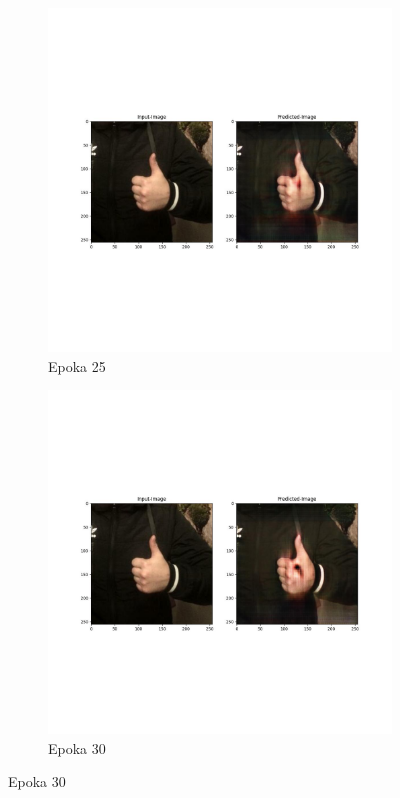 \documentclass[12pt]{article}
\begin{document}
\begin{sloppypar}
{{\begin{figure}
    \end{figure}
    \begin{figure}
      \begin{subfigure}{.5\textwidth}
        \centering
        \includegraphics[width=.8\linewidth]{cycle-gan/epoch-25.jpg}
        \caption{Epoka 25}
        \label{fig:cg-25}
      \end{subfigure}%
      \begin{subfigure}{.5\textwidth}
        \centering
        \includegraphics[width=.8\linewidth]{cycle-gan/epoch-30.jpg}
        \caption{Epoka 30}
        \label{fig:cg-30}
      \end{subfigure}

\end{figure}}}
\end{sloppypar}
\end{document}
